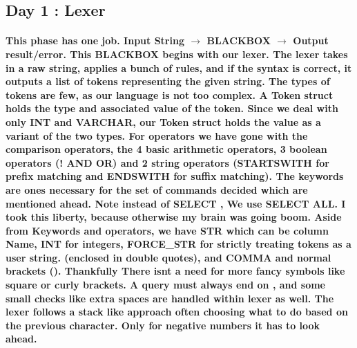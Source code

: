\documentclass{article}
\begin{document}
\subsection{Day 1 : Lexer}

\paragraph{
    This phase has one job. \newline
    Input String $\rightarrow$  \textbf{BLACKBOX} $\rightarrow$   Output result/error.
    This \textbf{BLACKBOX} begins with our lexer. The lexer takes in a raw string, applies a bunch of rules, and if the syntax is correct,
    it outputs a list of tokens representing the given string. The types of tokens are few, as our language is not too complex.
    A Token struct holds the type and associated value of the token. Since we deal with only INT and VARCHAR, our Token struct holds the value as a variant of the two types.
    For operators we have gone with the comparison operators, the 4 basic arithmetic operators, 3 boolean operators (! AND OR)
    and 2 string operators (STARTSWITH for prefix matching and ENDSWITH for suffix matching). The keywords are ones necessary for the set of commands decided which are mentioned ahead.
    Note instead of SELECT \*, We use SELECT ALL. I took this liberty, because otherwise my brain was going boom.
    Aside from Keywords and operators, we have STR which can be column Name, INT for integers, FORCE\_STR for strictly treating tokens as a user string. (enclosed in double quotes),
    and COMMA and normal brackets (). Thankfully There isnt a need for more fancy symbols like square or curly brackets.
    A query must always end on \;, and some small checks like extra spaces are handled within lexer as well.
    The lexer follows a stack like approach often choosing what to do based on the previous character. Only for negative numbers it has to look ahead.
} \mbox{} \\
\end{document}
